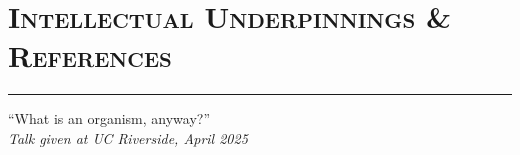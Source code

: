 \documentclass[]{article}
\makeatletter
\newcommand{\vhrulefill}[1]{\leavevmode\leaders\hrule\@height#1\hfill \kern\z@}
\makeatother
\begin{document}
\BgThispage
\pagestyle{alldocument}

\section*{\fontsize{16}{48}\selectfont \textsc{Intellectual Underpinnings \& References}}
\vspace{-4mm}
\hspace{0.165\textwidth}\vhrulefill{0.4pt}

\begin{flushright}
``What is an organism, anyway?''\\
\textit{Talk given at UC Riverside, April 2025}
\end{flushright}

\vspace{-6mm}

\nocite{*} 


 
\end{document}
